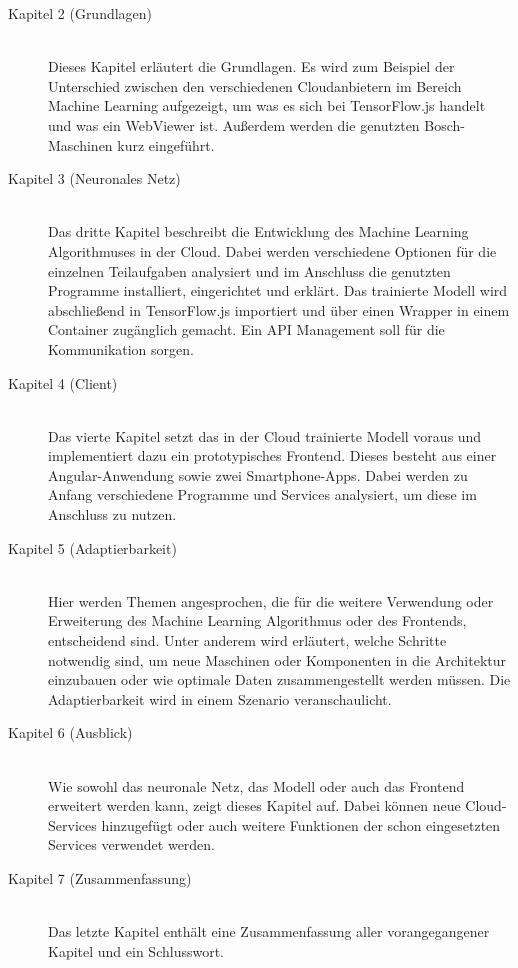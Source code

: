 \begin{description}

    \item[Kapitel 2 (Grundlagen)]\hfill \\
    Dieses Kapitel erläutert die Grundlagen. Es wird zum Beispiel der Unterschied zwischen den verschiedenen
    Cloudanbietern im Bereich Machine Learning aufgezeigt, um was es sich bei TensorFlow.js handelt und was ein WebViewer
    ist. Außerdem werden die genutzten Bosch-Maschinen kurz eingeführt.

    \item[Kapitel 3 (Neuronales Netz)]\hfill \\
    Das dritte Kapitel beschreibt die Entwicklung des Machine Learning Algorithmuses in der Cloud. Dabei werden
    verschiedene Optionen für die einzelnen Teilaufgaben analysiert und im Anschluss die genutzten Programme
    installiert, eingerichtet und erklärt. Das trainierte Modell wird abschließend in TensorFlow.js importiert und über
    einen Wrapper in einem Container zugänglich gemacht. Ein API Management soll für die Kommunikation sorgen.

    \item[Kapitel 4 (Client)]\hfill \\
    Das vierte Kapitel setzt das in der Cloud trainierte Modell voraus und implementiert dazu ein prototypisches
    Frontend. Dieses besteht aus einer Angular-Anwendung sowie zwei Smartphone-Apps. Dabei werden zu Anfang verschiedene
    Programme und Services analysiert, um diese im Anschluss zu nutzen.

    \item[Kapitel 5 (Adaptierbarkeit)]\hfill \\
    Hier werden Themen angesprochen, die für die weitere Verwendung oder Erweiterung des Machine Learning Algorithmus
    oder des Frontends, entscheidend sind. Unter anderem wird erläutert, welche Schritte notwendig sind, um neue
    Maschinen oder Komponenten in die Architektur einzubauen oder wie optimale Daten zusammengestellt werden müssen. Die
    Adaptierbarkeit wird in einem Szenario veranschaulicht.

    \item[Kapitel 6 (Ausblick)]\hfill \\
    Wie sowohl das neuronale Netz, das Modell oder auch das Frontend erweitert werden kann, zeigt dieses Kapitel auf.
    Dabei können neue Cloud-Services hinzugefügt oder auch weitere Funktionen der schon eingesetzten Services verwendet
    werden.

    \item[Kapitel 7 (Zusammenfassung)]\hfill \\
    Das letzte Kapitel enthält eine Zusammenfassung aller vorangegangener Kapitel und ein Schlusswort.

\end{description}